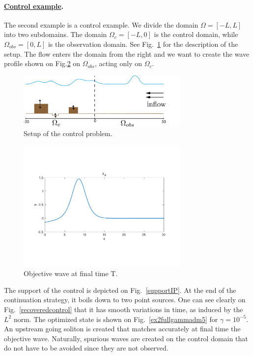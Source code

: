 \paragraph{\underline{Control example}.}
The second example is a control example. We divide the domain $\Omega = [-L,L]$ into two subdomains. The domain $\Omega_c = [-L,0]$ is the control domain, while $\Omega_{obs} = [0,L]$ is the observation domain. See Fig.~\ref{controlsetup} for the description of the setup. The flow enters the domain from the right and we want to create the wave profile shown on Fig.\ref{objectivewave} on $\Omega_{obs}$, acting only on $\Omega_c$.
\begin{figure}[!h]
\includegraphics[width = 0.75\textwidth]{images/control_setup.png}
\caption{Setup of the control problem.}
\label{controlsetup}
\end{figure}
\begin{figure}[!h]
\includegraphics[width = 0.75\textwidth]{images/ex2yd.pdf}
\caption{Objective wave at final time T.}
\label{objectivewave}
\end{figure}
The support of the control is depicted on Fig.~\ref{supportIP}. At the end of the continuation strategy, it boils down to two point sources. One can see clearly on Fig.~\ref{recoveredcontrol} that it has smooth variations in time, as induced by the $L^2$ norm. The optimized state is shown on Fig.~\ref{ex2fullgammadm5} for $\gamma = 10^{-5}$. An upstream going soliton is created that matches accurately at final time the objective wave. Naturally, spurious waves are created on the control domain that do not have to be avoided since they are not observed.
